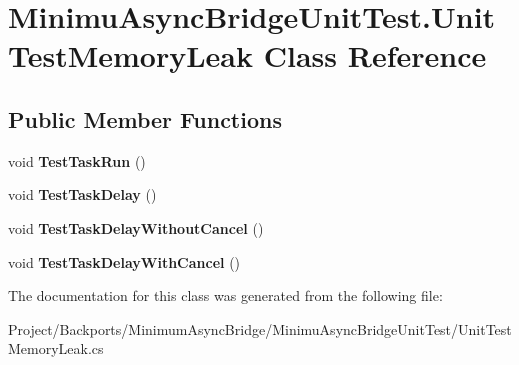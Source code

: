 \hypertarget{class_minimu_async_bridge_unit_test_1_1_unit_test_memory_leak}{}\section{Minimu\+Async\+Bridge\+Unit\+Test.\+Unit\+Test\+Memory\+Leak Class Reference}
\label{class_minimu_async_bridge_unit_test_1_1_unit_test_memory_leak}
\subsection*{Public Member Functions}
\begin{DoxyCompactItemize}
\item 
\mbox{\label{class_minimu_async_bridge_unit_test_1_1_unit_test_memory_leak_ac2a68ecb4ea205c9a4c274bc5971440c}} 
void {\bfseries Test\+Task\+Run} ()
\item 
\mbox{\label{class_minimu_async_bridge_unit_test_1_1_unit_test_memory_leak_ae135c6b4ce6f7ba3fd4f5db8cd9e4cd3}} 
void {\bfseries Test\+Task\+Delay} ()
\item 
\mbox{\label{class_minimu_async_bridge_unit_test_1_1_unit_test_memory_leak_a2cabda37a17fdf4086a39859ff5a2a52}} 
void {\bfseries Test\+Task\+Delay\+Without\+Cancel} ()
\item 
\mbox{\label{class_minimu_async_bridge_unit_test_1_1_unit_test_memory_leak_a080f60536f8957defa29d3e1371e10d5}} 
void {\bfseries Test\+Task\+Delay\+With\+Cancel} ()
\end{DoxyCompactItemize}


The documentation for this class was generated from the following file\+:\begin{DoxyCompactItemize}
\item 
Project/\+Backports/\+Minimum\+Async\+Bridge/\+Minimu\+Async\+Bridge\+Unit\+Test/Unit\+Test\+Memory\+Leak.\+cs\end{DoxyCompactItemize}
